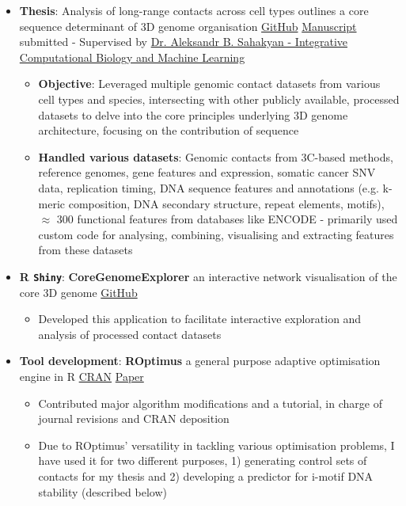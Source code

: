 \documentclass[a4paper,11pt]{article}
\newcommand{\resumeItem}[2]{
  \item\small{
    \textbf{#1}{: #2 \vspace{-2pt}}
  }
}
\newcommand{\resumeItemListStart}{\begin{itemize}}
\newcommand{\resumeItemListEnd}{\end{itemize}\vspace{-5pt}}
\begin{document}
            \resumeItemListStart
                \resumeItem{Thesis}{Analysis of long-range contacts across cell types outlines a core sequence determinant of 3D genome organisation \href{https://github.com/SahakyanLab/GenomicContactDynamics}{GitHub} \href{https://drive.google.com/file/d/1j3xg4ipr3ruG7vPtyXWO4wrDjJaRznfg/view?usp=share_link}{Manuscript} submitted - Supervised by \href{https://www.imm.ox.ac.uk/research/research-groups/sahakyan-group-integrative-computational-biology-and-machine-learning}{Dr. Aleksandr B. Sahakyan - Integrative Computational Biology and Machine Learning}}
                    \begin{itemize}
                        \resumeItem {Objective}{Leveraged multiple genomic contact datasets from various cell types and species, intersecting with other publicly available, processed datasets to delve into the core principles underlying 3D genome architecture, focusing on the contribution of sequence}
                        \resumeItem {Handled various datasets}{Genomic contacts from 3C-based methods, reference genomes, gene features and expression, somatic cancer SNV data, replication timing, DNA sequence features and annotations (e.g. k-meric composition, DNA secondary structure, repeat elements, motifs), $\approx$ 300 functional features from databases like ENCODE - primarily used custom code for analysing, combining, visualising and extracting features from these datasets}
                    \end{itemize}
            \resumeItemListEnd

            \resumeItemListStart
                \resumeItem{R \texttt{Shiny}}{\textbf{CoreGenomeExplorer} an interactive network visualisation of the core 3D genome \href{https://github.com/SahakyanLab/CoreGenomeExplorer/tree/master}{GitHub}}
                    \begin{itemize}
                        \item {Developed this application to facilitate interactive exploration and analysis of processed contact datasets}
                    \end{itemize}
            \resumeItemListEnd
            
            \resumeItemListStart
                \resumeItem{Tool development}{\textbf{ROptimus} a general purpose adaptive optimisation engine in R \href{https://cran.r-project.org/web/packages/ROptimus/index.html}{CRAN} \href{https://academic.oup.com/bioinformatics/article/39/5/btad292/7152277}{Paper}}
                    \begin{itemize}
                        \item {Contributed major algorithm modifications and a tutorial, in charge of journal revisions and CRAN deposition}
                        \item {Due to ROptimus' versatility in tackling various optimisation problems, I have used it for two different purposes, 1) generating control sets of contacts for my thesis and 2) developing a predictor for i-motif DNA stability (described below)}
                    \end{itemize}
            \resumeItemListEnd
            
\end{document}
